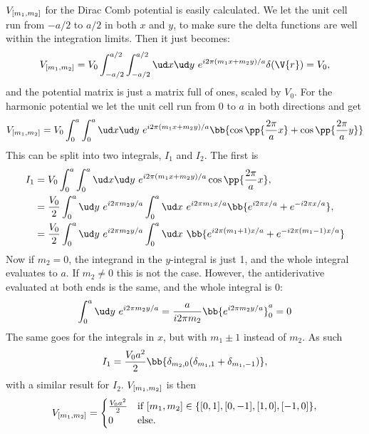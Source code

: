 \documentclass[main.tex]{subfiles}
\begin{document}
	$ V_{[m_1, m_2]} $ for the Dirac Comb potential is easily calculated. We let the unit cell run from $ -a/2 $ to $ a/2 $ in both $ x $ and $ y $, to make sure the delta functions are well within the integration limits. Then it just becomes:
	\begin{equation}
		V\coef{m_1, m_2} = V_0 \int_{-a/2}^{a/2} \int_{-a/2}^{a/2} \ud x \ud y \ e^{i 2\pi (m_1 x + m_2 y)/a} \delta(\V{r}) = V_0,
	\end{equation}
	and the potential matrix is just a matrix full of ones, scaled by $ V_0 $. For the harmonic potential we let the unit cell run from $ 0 $ to $ a $ in both directions and get
	\begin{equation}
		V\coef{m_1, m_2} = V_0 \int_{0}^{a} \int_0^a \ud x \ud y \ e^{i 2\pi(m_1x + m_2y)/a} \bb{\cos\pp{\frac{2\pi}{a} x} + \cos\pp{\frac{2\pi}{a} y}}
	\end{equation}
	This can be split into two integrals, $ I_1 $ and $ I_2 $. The first is
	\begin{align}
		I_1 &=  V_0 \int_{0}^{a} \int_0^a \ud x \ud y \ e^{i 2\pi(m_1x + m_2y)/a}\cos\pp{\frac{2\pi}{a} x}, \\
		&= \frac{V_0}{2} \int_{0}^{a} \ud y\ e^{i 2\pi m_2 y / a} \int_{0}^{a} \ud x \ e^{i 2\pi m_1 x/a} \bb{e^{i 2\pi x/a} + e^{-i 2\pi x/a}}, \\
		&= \frac{V_0}{2} \int_0^a \ud y\  e^{i 2\pi m_2 y / a} \int_{0}^{a} \ud x\ \bb{e^{i 2\pi(m_1+1) x/a} + e^{-i 2\pi (m_1-1)x/a}}
	\end{align}
	Now if $ m_2 = 0 $, the integrand in the $ y $-integral is just 1, and the whole integral evaluates to $ a $. If $ m_2 \neq 0 $ this is not the case. However, the antiderivative evaluated at both ends is the same, and the whole integral is 0:
	\begin{equation}
		\int_{0}^{a} \ud y\ e^{i 2\pi m_2 y/a} = \frac{a}{i 2\pi m_2} \bb{e^{i2\pi m_2 y /a}}_0^a = 0
	\end{equation}
	The same goes for the integrals in $ x $, but with $ m_1 \pm 1 $ instead of $ m_2 $. As such
	\begin{equation}
		I_1 = \frac{V_0 a^2}{2} \bb{\delta_{m_2,0} (\delta_{m_1, 1} + \delta_{m_1, -1})},
	\end{equation}
	with a similar result for $ I_2 $. $ V_{[m_1, m_2]} $ is then
	\begin{equation}
		V_{[m_1, m_2]} = \begin{cases}
			\frac{V_0 a^2}{2} 	& \text{if } [m_1, m_2] \in \{[0,1], [0,-1], [1,0], [-1,0]\}, \\
			0					& \text{else}.
		\end{cases}
	\end{equation}
\end{document}
